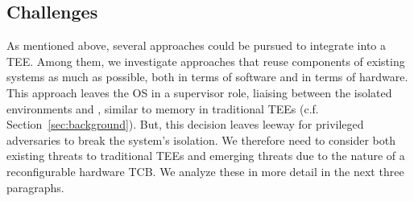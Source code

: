 \subsection{Challenges}
\label{sec:problemStatement:challenges}
As mentioned above, several approaches could be pursued to integrate \sphw into a TEE. Among them, we investigate approaches that reuse components of existing systems as much as possible, both in terms of software and in terms of hardware.  
This approach leaves the OS in a supervisor role, liaising between the isolated environments and \sphw, similar to memory in traditional TEEs (c.f. Section~\ref{sec:background}). But, this decision leaves leeway for privileged adversaries to break the system's isolation. We therefore need to consider both existing threats to traditional TEEs and emerging threats due to the nature of a reconfigurable hardware TCB. 
We analyze these in more detail in the next three paragraphs.



